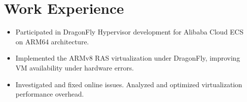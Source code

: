 \documentclass{resume}
\newcommand{\en}[1]{#1}
\newcommand{\zh}[1]{}
\begin{document}
\section{\en{Work Experience}\zh{工作经历}}
\en{}
\zh{\datedsubsection{\textbf{\href{https://www.aliyun.com/}{阿里云}}}{05/2023 -- 09/2023}}
\en{}
\zh{\role{虚拟化研发实习}{弹性计算-神龙虚拟化}}
\begin{itemize}
      \item \en {
            Participated in DragonFly Hypervisor development for Alibaba Cloud ECS on ARM64 architecture.
      }
      \zh {
            参与 ARM64 架构、倚天平台上神龙 Hypervisor 的研发。
      }
      \item \en {
            Implemented the ARMv8 RAS virtualization under DragonFly, improving VM availability under hardware errors.
      }
      \zh {
            在神龙架构下，实现了 ARMv8 RAS 功能扩展的虚拟化，提高了虚拟机在硬件错误下的可用性。
      }
      \item \en {
            Investigated and fixed online issues. Analyzed and optimized virtualization performance overhead.
      }
      \zh {
            线上问题的排查与修复。虚拟机性能开销的分析与优化。
      }
\end{itemize}
\en{}
\zh{\datedsubsection{\textbf{\href{https://www.bytedance.com/}{字节跳动}}}{09/2021 -- 04/2023}}
\en{}
\zh{\role{Rust 研发实习}{Lark Cross Platform Infrastructure}}
\end{document}
